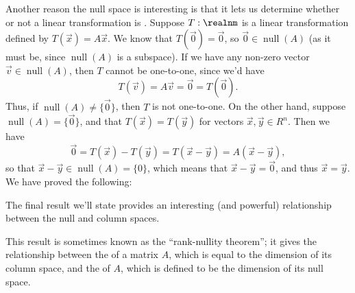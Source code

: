 \medskip

Another reason the null space is interesting is that it lets us determine whether or not a linear transformation is . Suppose $T:\realnm$ is a linear transformation defined by $T(\vec x) = A\vec x$. We know that $T(\vec 0) = \vec 0$, so $\vec 0\in \operatorname{null}(A)$ (as it must be, since $\operatorname{null}(A)$ is a subspace). If we have any non-zero vector $\vec v\in\operatorname{null}(A)$, then $T$ cannot be one-to-one, since we'd have
\[
T(\vec v) = A\vec v = \vec 0 = T(\vec 0).
\]
Thus, if $\operatorname{null}(A)\neq \{\vec 0\}$, then $T$ is not one-to-one. On the other hand, suppose $\operatorname{null}(A)=\{\vec 0\}$, and that $T(\vec x) = T(\vec y)$ for vectors $\vec x, \vec y\in R^n$. Then we have
\[
\vec 0 = T(\vec x) - T(\vec y) = T(\vec x - \vec y) = A(\vec x - \vec y),
\]
so that $\vec x - \vec y\in \operatorname{null}(A) = \{0\}$, which means that $\vec x - \vec y = \vec{0}$, and thus $\vec x = \vec y$. We have proved the following:


\smallskip


\smallskip

The final result we'll state provides an interesting (and powerful) relationship between the null and column spaces. 

\smallskip


\smallskip

This result is sometimes known as the ``rank-nullity theorem''; it gives the relationship between the  of a matrix $A$, which is equal to the dimension of its column space, and the  of $A$, which is defined to be the dimension of its null space.

